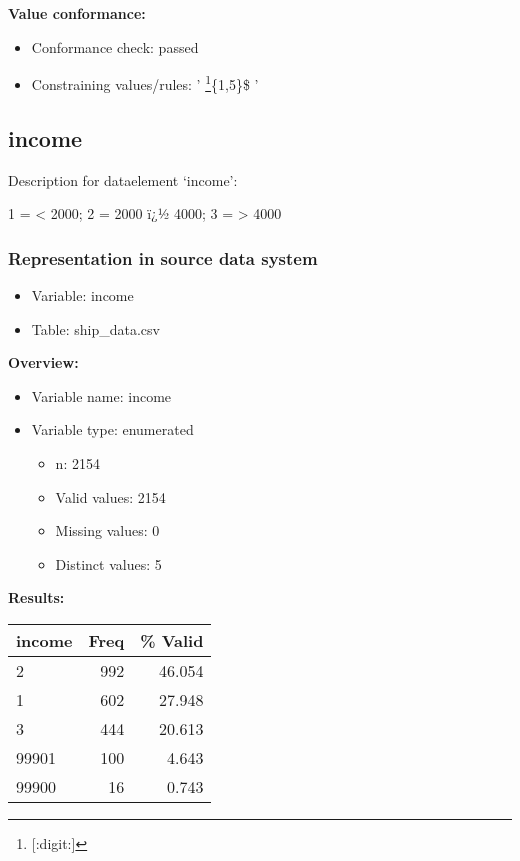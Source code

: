 \documentclass[
]{article}
\providecommand{\tightlist}{%
  \setlength{\itemsep}{0pt}\setlength{\parskip}{0pt}}
\begin{document}
\textbf{Value conformance:}

\begin{itemize}
\tightlist
\item
  Conformance check: passed
\item
  Constraining values/rules: ' \footnote{{[}:digit:{]}}\{1,5\}\$ '
\end{itemize}

\newpage

\hypertarget{income}{%
\subsection{income}\label{income}}

Description for dataelement `income':

1 = \textless{} 2000; 2 = 2000 ï¿½ 4000; 3 = \textgreater{} 4000

\hypertarget{representation-in-source-data-system-15}{%
\subsubsection{\texorpdfstring{Representation in \textbf{source} data
system}{Representation in source data system}}\label{representation-in-source-data-system-15}}

\begin{itemize}
\tightlist
\item
  Variable: income
\item
  Table: ship\_data.csv
\end{itemize}

\textbf{Overview:}

\begin{itemize}
\tightlist
\item
  Variable name: income
\item
  Variable type: enumerated

  \begin{itemize}
  \tightlist
  \item
    n: 2154
  \item
    Valid values: 2154
  \item
    Missing values: 0
  \item
    Distinct values: 5
  \end{itemize}
\end{itemize}

\textbf{Results:}\\

\begin{table}[H]
\centering
\begin{tabular}{l|r|r}
\hline
\textbf{income} & \textbf{Freq} & \textbf{\% Valid}\\
\hline
2 & 992 & 46.054\\
\hline
1 & 602 & 27.948\\
\hline
3 & 444 & 20.613\\
\hline
99901 & 100 & 4.643\\
\hline
99900 & 16 & 0.743\\
\hline
\end{tabular}
\end{table}
\end{document}

